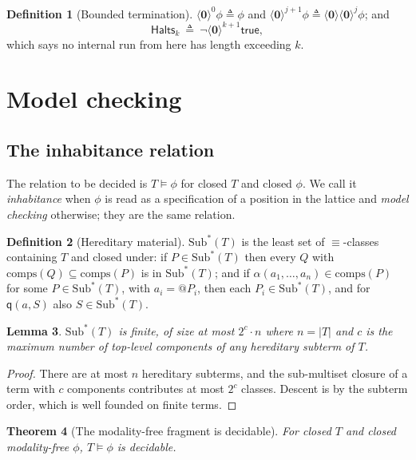 \documentclass[11pt]{article}
\makeatletter
\theoremstyle{plain}
\newtheorem{theorem}{Theorem}[section]
\newtheorem{lemma}[theorem]{Lemma}
\theoremstyle{definition}
\newtheorem{definition}[theorem]{Definition}
\theoremstyle{remark}
\newcommand{\quo}[1]{@#1}
\newcommand{\nil}{\mathbf{0}}
\newcommand{\qq}{\mathsf{q}}
\newcommand{\scong}{\equiv}
\newcommand{\may}[1]{\langle #1 \rangle}
\newcommand{\sat}{\models}
\newcommand{\comps}[1]{\mathrm{comps}(#1)}
\newcommand{\Sub}[1]{\mathrm{Sub}^{*}(#1)}
\makeatother
\begin{document}
\begin{definition}[Bounded termination]
\label{def:term}
$\may{\nil}^{0}\phi \triangleq \phi$ and
$\may{\nil}^{j+1}\phi \triangleq \may{\nil}\may{\nil}^{j}\phi$; and
\[
  \mathsf{Halts}_{k} \ \triangleq\ \neg\may{\nil}^{k+1}\mathsf{true},
\]
which says no internal run from here has length exceeding $k$.
\end{definition}

\section{Model checking}
\label{sec:mc}

\subsection{The inhabitance relation}

The relation to be decided is $T \sat \phi$ for closed $T$ and closed $\phi$.
We call it \emph{inhabitance} when $\phi$ is read as a specification of a
position in the lattice and \emph{model checking} otherwise; they are the same
relation.

\begin{definition}[Hereditary material]
\label{def:sub}
$\Sub{T}$ is the least set of $\scong$-classes containing $T$ and closed under:
if $P \in \Sub{T}$ then every $Q$ with $\comps{Q} \subseteq \comps{P}$ is in
$\Sub{T}$; and if $\alpha(a_1,\dots,a_n) \in \comps{P}$ for some
$P \in \Sub{T}$, with $a_i = \quo{P_i}$, then each $P_i \in \Sub{T}$, and for
$\qq(a,S)$ also $S \in \Sub{T}$.
\end{definition}

\begin{lemma}
\label{lem:subfinite}
$\Sub{T}$ is finite, of size at most $2^{c} \cdot n$ where $n = |T|$ and $c$ is
the maximum number of top-level components of any hereditary subterm of $T$.
\end{lemma}

\begin{proof}
There are at most $n$ hereditary subterms, and the sub-multiset closure of a
term with $c$ components contributes at most $2^{c}$ classes. Descent is by the
subterm order, which is well founded on finite terms.
\end{proof}

\begin{theorem}[The modality-free fragment is decidable]
\label{thm:decstruct}
For closed $T$ and closed modality-free $\phi$, $T \sat \phi$ is decidable.
\end{theorem}
\end{document}
